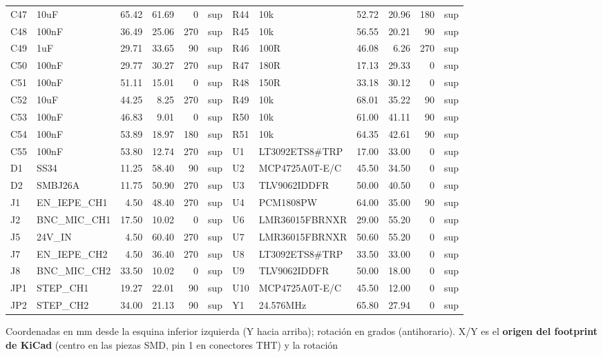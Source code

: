 \documentclass[10pt,a4paper]{article}
\begin{document}
{\begin{longtable}{@{}llrrrl|llrrrl@{}}
C47 & 10uF & 65.42 & 61.69 & 0 & sup & R44 & 10k & 52.72 & 20.96 & 180 & sup\\
C48 & 100nF & 36.49 & 25.06 & 270 & sup & R45 & 10k & 56.55 & 20.21 & 90 & sup\\
C49 & 1uF & 29.71 & 33.65 & 90 & sup & R46 & 100R & 46.08 & 6.26 & 270 & sup\\
C50 & 100nF & 29.77 & 30.27 & 270 & sup & R47 & 180R & 17.13 & 29.33 & 0 & sup\\
C51 & 100nF & 51.11 & 15.01 & 0 & sup & R48 & 150R & 33.18 & 30.12 & 0 & sup\\
C52 & 10uF & 44.25 & 8.25 & 270 & sup & R49 & 10k & 68.01 & 35.22 & 90 & sup\\
C53 & 100nF & 46.83 & 9.01 & 0 & sup & R50 & 10k & 61.00 & 41.11 & 90 & sup\\
C54 & 100nF & 53.89 & 18.97 & 180 & sup & R51 & 10k & 64.35 & 42.61 & 90 & sup\\
C55 & 100nF & 53.80 & 12.74 & 270 & sup & U1 & LT3092ETS8\#TRP & 17.00 & 33.00 & 0 & sup\\
D1 & SS34 & 11.25 & 58.40 & 90 & sup & U2 & MCP4725A0T-E/C & 45.50 & 34.50 & 0 & sup\\
D2 & SMBJ26A & 11.75 & 50.90 & 270 & sup & U3 & TLV9062IDDFR & 50.00 & 40.50 & 0 & sup\\
J1 & EN\_\allowbreak{}IEPE\_\allowbreak{}CH1 & 4.50 & 48.40 & 270 & sup & U4 & PCM1808PW & 64.00 & 35.00 & 90 & sup\\
J2 & BNC\_\allowbreak{}MIC\_\allowbreak{}CH1 & 17.50 & 10.02 & 0 & sup & U6 & LMR36015FBRNXR & 29.00 & 55.20 & 0 & sup\\
J5 & 24V\_\allowbreak{}IN & 4.50 & 60.40 & 270 & sup & U7 & LMR36015FBRNXR & 50.60 & 55.20 & 0 & sup\\
J7 & EN\_\allowbreak{}IEPE\_\allowbreak{}CH2 & 4.50 & 36.40 & 270 & sup & U8 & LT3092ETS8\#TRP & 33.50 & 33.00 & 0 & sup\\
J8 & BNC\_\allowbreak{}MIC\_\allowbreak{}CH2 & 33.50 & 10.02 & 0 & sup & U9 & TLV9062IDDFR & 50.00 & 18.00 & 0 & sup\\
JP1 & STEP\_\allowbreak{}CH1 & 19.27 & 22.01 & 90 & sup & U10 & MCP4725A0T-E/C & 45.50 & 12.00 & 0 & sup\\
JP2 & STEP\_\allowbreak{}CH2 & 34.00 & 21.13 & 90 & sup & Y1 & 24.576MHz & 65.80 & 27.94 & 0 & sup\\
\bottomrule\end{longtable}}
Coordenadas en mm desde la esquina inferior izquierda (Y hacia arriba); rotación en grados (antihorario).
X/Y es el \textbf{origen del footprint de KiCad} (centro en las piezas SMD, pin 1 en conectores THT) y la rotación
\end{document}
